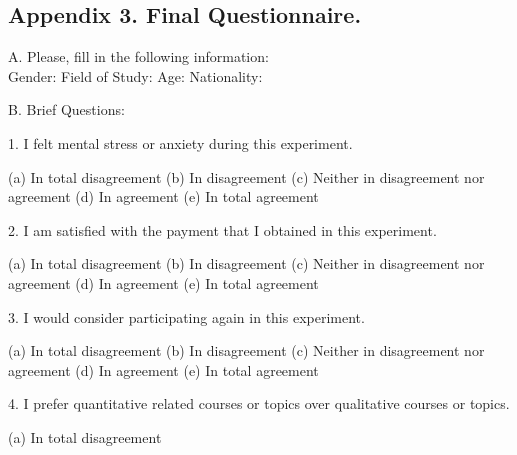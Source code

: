 \documentclass[a4paper, 12pt]{article}
\begin{document}
\begin{appendices}
\chapter{\textbf{Appendix 3. Final Questionnaire.}}

A. Please, fill in the following information:\\
Gender: \newline
Field of Study: \newline
Age: \newline
Nationality: \newline

\noindent
B. Brief Questions:\\
\begin{center}
1. I felt mental stress or anxiety during this experiment. 
\end{center}
(a) In total disagreement \newline
(b) In disagreement \newline
(c) Neither in disagreement nor agreement \newline
(d) In agreement \newline
(e) In total agreement \newline
\begin{center}
2. I am satisfied with the payment that I obtained in this experiment.    
\end{center}
(a) In total disagreement \newline
(b) In disagreement \newline
(c) Neither in disagreement nor agreement \newline
(d) In agreement \newline
(e) In total agreement \newline
\begin{center}
3. I would consider participating again in this experiment. 
\end{center}
(a) In total disagreement \newline
(b) In disagreement \newline
(c) Neither in disagreement nor agreement \newline
(d) In agreement \newline
(e) In total agreement \newline
\begin{center}
4. I prefer quantitative related courses or topics over qualitative courses or topics.
\end{center}
(a) In total disagreement \newline

\end{appendices}
\end{document}
